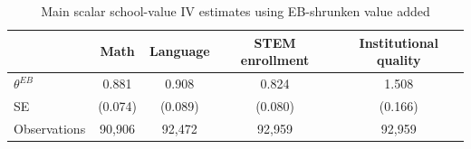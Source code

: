 \begin{table}[!htbp]
\centering
\caption{Main scalar school-value IV estimates using EB-shrunken value added}
\label{tab:scalar_school_value_iv_main_four_expected_va_eb}
\begin{tabular}{lcccc}
\toprule
 & Math & Language & STEM enrollment & Institutional quality \\
\midrule
$\theta^{EB}$ & 0.881 & 0.908 & 0.824 & 1.508 \\
SE & (0.074) & (0.089) & (0.080) & (0.166) \\
Observations & 90,906 & 92,472 & 92,959 & 92,959 \\
\bottomrule
\end{tabular}
\end{table}

